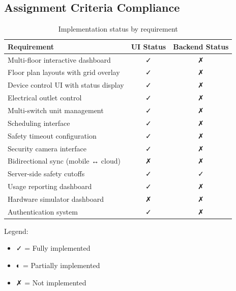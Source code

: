 \documentclass[12pt,a4paper]{article}
\begin{document}
\subsection{Assignment Criteria Compliance}

\begin{table}[h]
\centering
\begin{tabularx}{\textwidth}{|X|c|c|}
\hline
\textbf{Requirement} & \textbf{UI Status} & \textbf{Backend Status} \\
\hline
Multi-floor interactive dashboard & \textcolor{implemented}{✓} & \textcolor{required}{✗} \\
\hline
Floor plan layouts with grid overlay & \textcolor{implemented}{✓} & \textcolor{required}{✗} \\
\hline
Device control UI with status display & \textcolor{implemented}{✓} & \textcolor{required}{✗} \\
\hline
Electrical outlet control & \textcolor{implemented}{✓} & \textcolor{required}{✗} \\
\hline
Multi-switch unit management & \textcolor{implemented}{✓} & \textcolor{required}{✗} \\
\hline
Scheduling interface & \textcolor{implemented}{✓} & \textcolor{required}{✗} \\
\hline
Safety timeout configuration & \textcolor{implemented}{✓} & \textcolor{required}{✗} \\
\hline
Security camera interface & \textcolor{implemented}{✓} & \textcolor{required}{✗} \\
\hline
Bidirectional sync (mobile ↔ cloud) & \textcolor{required}{✗} & \textcolor{required}{✗} \\
\hline
Server-side safety cutoffs & \textcolor{implemented}{✓} & \textcolor{implemented}{✓} \\
\hline
Usage reporting dashboard & \textcolor{implemented}{✓} & \textcolor{required}{✗} \\
\hline
Hardware simulator dashboard & \textcolor{required}{✗} & \textcolor{required}{✗} \\
\hline
Authentication system & \textcolor{implemented}{✓} & \textcolor{required}{✗} \\
\hline
\end{tabularx}
\caption{Implementation status by requirement}
\end{table}

Legend:
\begin{itemize}
    \item \textcolor{implemented}{✓} = Fully implemented
    \item \textcolor{pending}{◐} = Partially implemented
    \item \textcolor{required}{✗} = Not implemented
\end{itemize}
\end{document}
